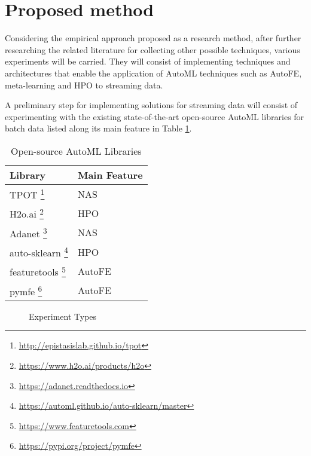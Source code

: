 \documentclass{sig-alternate-br}
\begin{document}
\section{Proposed method}

Considering the empirical approach proposed as a research method, after further researching the related literature for collecting other possible techniques, various experiments will be carried. They will consist of implementing techniques and architectures that enable the application of AutoML techniques such as AutoFE, meta-learning and HPO to streaming data.

A preliminary step for implementing solutions for streaming data will consist of experimenting with the existing state-of-the-art open-source AutoML libraries for batch data listed along its main feature in Table \ref{table:libraries}. 

\begin{savenotes}
\begin{table}[h]
\renewcommand{\arraystretch}{1.25}
\caption{Open-source AutoML Libraries}
\label{table:libraries}
\centering
\begin{tabular}{|l|l|}
\hline
\textbf{Library} & \textbf{Main Feature} \\ \hline
TPOT \footnote{\url{http://epistasislab.github.io/tpot}} & NAS \\ \hline
H2o.ai \footnote{\url{https://www.h2o.ai/products/h2o}} & HPO \\ \hline
Adanet \footnote{\url{https://adanet.readthedocs.io}} & NAS \\ \hline
auto-sklearn \footnote{\url{https://automl.github.io/auto-sklearn/master}} & HPO \\ \hline
featuretools \footnote{\url{https://www.featuretools.com}} & AutoFE \\ \hline
pymfe \footnote{\url{https://pypi.org/project/pymfe}} & AutoFE \\ \hline
\end{tabular}
\end{table}
\end{savenotes}

\begin{figure}[h]
\centering 
{}
\caption{Experiment Types}
\label{fig:experiments}
\end{figure}
\end{document}
